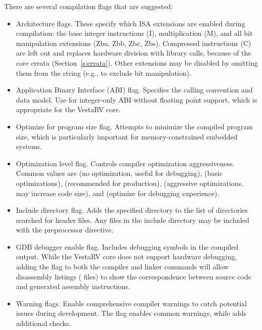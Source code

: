 \documentclass[11pt,pdftex,portrait,letterpaper]{article}
\begin{document}
There are several compilation flags that are suggested:
\begin{itemize}
\item {} Architecture flags. These specify which ISA extensions are enabled during compilation: the base integer instructions (I), multiplication (M), and all bit manipulation extensions (Zba, Zbb, Zbc, Zbs). Compressed instructions (C) are left out and  replaces hardware division with library calls, because of the core errata (Section~\ref{s:errata}). Other extensions may be disabled by omitting them from the string (e.g.,  to exclude bit manipulation).

\item {} Application Binary Interface (ABI) flag. Specifies the calling convention and data model. Use  for integer-only ABI without floating point support, which is appropriate for the VestaRV core.

\item {} Optimize for program size flag. Attempts to minimize the compiled program size, which is particularly important for memory-constrained embedded systems.

\item {} Optimization level flag. Controls compiler optimization aggressiveness. Common values are  (no optimization, useful for debugging),  (basic optimizations),  (recommended for production),  (aggressive optimizations, may increase code size), and  (optimize for debugging experience).

\item {} Include directory flag. Adds the specified directory to the list of directories searched for header files. Any files in the include directory may be included with the  preprocessor directive.

\item {} GDB debugger enable flag. Includes debugging symbols in the compiled output. While the VestaRV core does not support hardware debugging, adding the  flag to both the compiler and linker commands will allow disassembly listings ( files) to show the correspondence between source code and generated assembly instructions.

\item {} Warning flags. Enable comprehensive compiler warnings to catch potential issues during development. The  flag enables common warnings, while  adds additional checks.
\end{itemize}
\end{document}
